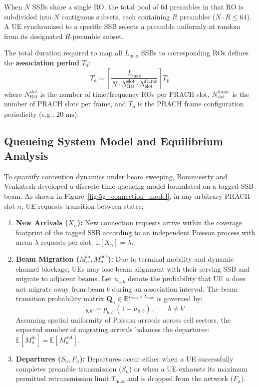 When $N$ SSBs share a single RO, the total pool of 64 preambles in that RO is subdivided into $N$ contiguous subsets, each containing $R$ preambles ($N \cdot R \le 64$). A UE synchronized to a specific SSB selects a preamble uniformly at random from its designated $R$-preamble subset.

The total duration required to map all $L_{\max}$ SSBs to corresponding ROs defines the \textbf{association period} $T_a$:
\begin{equation}
    \label{eq:association_period}
    T_a = \left\lceil \frac{L_{\max}}{N \cdot N_{\mathrm{RO}}^{\mathrm{slot}} \cdot N_{\mathrm{slot}}^{\mathrm{frame}}} \right\rceil T_p
\end{equation}
where $N_{\mathrm{RO}}^{\mathrm{slot}}$ is the number of time/frequency ROs per PRACH slot, $N_{\mathrm{slot}}^{\mathrm{frame}}$ is the number of PRACH slots per frame, and $T_p$ is the PRACH frame configuration periodicity (e.g., $20\text{~ms}$).

\subsection{Queueing System Model and Equilibrium Analysis}
To quantify contention dynamics under beam sweeping, Bommisetty and Venkatesh \cite{bommisetty2023connection} developed a discrete-time queueing model formulated on a tagged SSB beam. As shown in Figure~\ref{fig:5g_connection_model}, in any arbitrary PRACH slot $n$, UE requests transition between states:
\begin{enumerate}
    \item \textbf{New Arrivals ($X_n$):} New connection requests arrive within the coverage footprint of the tagged SSB according to an independent Poisson process with mean $\lambda$ requests per slot: $\mathbb{E}[X_n] = \lambda$.
    \item \textbf{Beam Migration ($M_n^{\mathrm{in}}, M_n^{\mathrm{out}}$):} Due to terminal mobility and dynamic channel blockage, UEs may lose beam alignment with their serving SSB and migrate to adjacent beams. Let $u_{u, b}$ denote the probability that UE $u$ does not migrate away from beam $b$ during an association interval. The beam transition probability matrix $\mathbf{Q}_u \in \mathbb{R}^{L_{\max} \times L_{\max}}$ is governed by:
    \begin{equation}
        [\mathbf{Q}_u]_{b, b'} = p_{b, b'} (1 - u_{u, b}), \qquad b \ne b'
    \end{equation}
    Assuming spatial uniformity of Poisson arrivals across cell sectors, the expected number of migrating arrivals balances the departures: $\mathbb{E}[M_n^{\mathrm{in}}] = \mathbb{E}[M_n^{\mathrm{out}}]$.
    \item \textbf{Departures ($S_n, F_n$):} Departures occur either when a UE successfully completes preamble transmission ($S_n$) or when a UE exhausts its maximum permitted retransmission limit $T_{\max}$ and is dropped from the network ($F_n$).
\end{enumerate}

